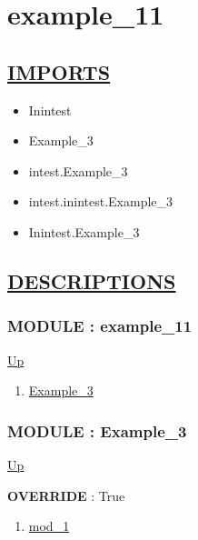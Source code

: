 \chapter*{example\_11}
\hypertarget{ecldoc:toc:example_11}{}

\section*{\underline{IMPORTS}}
\begin{itemize}
\item Inintest
\item Example\_3
\item intest.Example\_3
\item intest.inintest.Example\_3
\item Inintest.Example\_3
\end{itemize}

\section*{\underline{DESCRIPTIONS}}
\subsection*{MODULE : example\_11}
\hypertarget{ecldoc:example_11}{}
\par
\begin{minipage}[t]{\textwidth}
\begin{flushleft}
  
\end{flushleft}
\end{minipage}
\hyperlink{ecldoc:toc:root}{Up} \\
\par
\par
\begin{enumerate}
\item \hyperlink{ecldoc:Inintest.Example_3}{Example\_3}
\end{enumerate}
\subsection*{MODULE : Example\_3}
\hypertarget{ecldoc:Inintest.Example_3}{}
\par
\begin{minipage}[t]{\textwidth}
\begin{flushleft}
  
\end{flushleft}
\end{minipage}
\hyperlink{ecldoc:example_11}{Up} \\
\par
\par
\textbf{OVERRIDE} : True \\
\begin{enumerate}
\item \hyperlink{ecldoc:Inintest.Example_3.mod_1}{mod\_1}
\end{enumerate}
